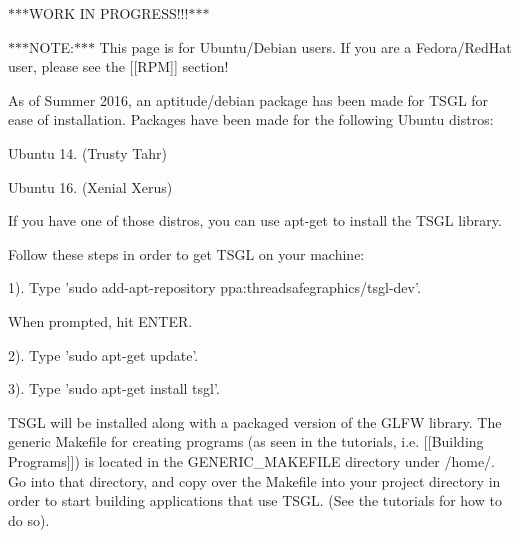 $\ast$$\ast$$\ast$\-W\-O\-R\-K I\-N P\-R\-O\-G\-R\-E\-S\-S!!!$\ast$$\ast$$\ast$

$\ast$$\ast$$\ast$\-N\-O\-T\-E\-:$\ast$$\ast$$\ast$ This page is for Ubuntu/\-Debian users. If you are a Fedora/\-Red\-Hat user, please see the \mbox{[}\mbox{[}R\-P\-M\mbox{]}\mbox{]} section!

As of Summer 2016, an aptitude/debian package has been made for T\-S\-G\-L for ease of installation. Packages have been made for the following Ubuntu distros\-:
\begin{DoxyItemize}
\item Ubuntu 14. (Trusty Tahr)
\item Ubuntu 16. (Xenial Xerus)
\end{DoxyItemize}

If you have one of those distros, you can use apt-\/get to install the T\-S\-G\-L library.

Follow these steps in order to get T\-S\-G\-L on your machine\-:

1). Type 'sudo add-\/apt-\/repository ppa\-:threadsafegraphics/tsgl-\/dev'.
\begin{DoxyItemize}
\item When prompted, hit E\-N\-T\-E\-R.
\end{DoxyItemize}

2). Type 'sudo apt-\/get update'.

3). Type 'sudo apt-\/get install tsgl'.

T\-S\-G\-L will be installed along with a packaged version of the G\-L\-F\-W library. The generic Makefile for creating programs (as seen in the tutorials, i.\-e. \mbox{[}\mbox{[}Building Programs\mbox{]}\mbox{]}) is located in the G\-E\-N\-E\-R\-I\-C\-\_\-\-M\-A\-K\-E\-F\-I\-L\-E directory under /home/. Go into that directory, and copy over the Makefile into your project directory in order to start building applications that use T\-S\-G\-L. (See the tutorials for how to do so). 